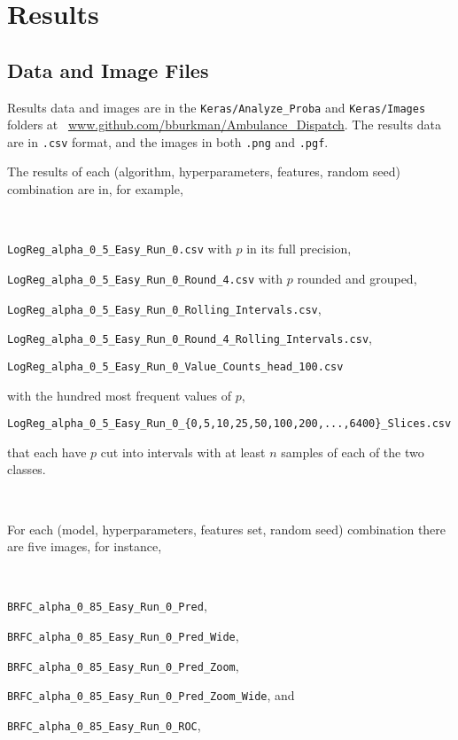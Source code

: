 \section{Results}\label{Results}

\subsection{Data and Image Files}
\label{data_files}

Results data and images are in the \verb|Keras/Analyze_Proba| and \verb|Keras/Images| folders at \
\url{www.github.com/bburkman/Ambulance_Dispatch}.  The results data are in \verb|.csv| format, and the images in both \verb|.png| and \verb|.pgf|.

The results of each (algorithm, hyperparameters, features, random seed) combination are in, for example, 

\

\qquad \verb|LogReg_alpha_0_5_Easy_Run_0.csv| with $p$ in its full precision,

\qquad \verb|LogReg_alpha_0_5_Easy_Run_0_Round_4.csv| with $p$ rounded and grouped,

\qquad \verb|LogReg_alpha_0_5_Easy_Run_0_Rolling_Intervals.csv|, 

\qquad \verb|LogReg_alpha_0_5_Easy_Run_0_Round_4_Rolling_Intervals.csv|, 

\qquad \verb|LogReg_alpha_0_5_Easy_Run_0_Value_Counts_head_100.csv|

\qquad \qquad  with the hundred most frequent values of $p$,

\qquad \verb|LogReg_alpha_0_5_Easy_Run_0_{0,5,10,25,50,100,200,...,6400}_Slices.csv| 

\qquad \qquad that each have $p$ cut into intervals with at least $n$ samples of each of the two classes.

\

For each (model, hyperparameters, features set, random seed) combination there are five images, for instance, 

\

\qquad \verb|BRFC_alpha_0_85_Easy_Run_0_Pred|,

\qquad \verb|BRFC_alpha_0_85_Easy_Run_0_Pred_Wide|, 

\qquad \verb|BRFC_alpha_0_85_Easy_Run_0_Pred_Zoom|,

\qquad \verb|BRFC_alpha_0_85_Easy_Run_0_Pred_Zoom_Wide|, and

\qquad \verb|BRFC_alpha_0_85_Easy_Run_0_ROC|, 

